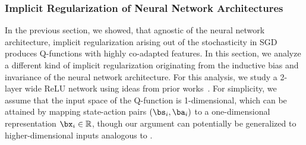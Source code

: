 \iffalse
\subsubsection{Implicit Regularization of Neural Network Architectures}

In the previous section, we showed, that agnostic of the neural network architecture, implicit regularization arising out of the stochasticity in SGD produces Q-functions with highly co-adapted features. In this section, we analyze a different kind of implicit regularization originating from the inductive bias and invariance of the neural network architecture.
For this analysis, we study a 2-layer wide ReLU network using ideas from prior works~\citep{blanc2020implicit,savarese2019infinite,wei2019regularization}.
For simplicity, we assume that the input space of the Q-function is 1-dimensional, which can be attained by mapping state-action pairs $(\bs_i, \ba_i)$ to a one-dimensional representation $\bx_i \in \mathbb{R}$, though our argument can potentially be generalized to higher-dimensional inputs analogous to \citet{}.


